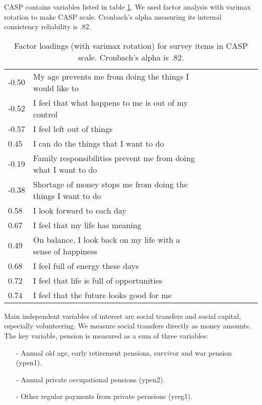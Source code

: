 \documentclass[10pt, letterpaper]{article}
\begin{document}
\begin{spacing}{1.4}
CASP contains  variables listed in table \ref{casp}. We used factor
analysis with varimax rotation to make CASP scale. Cronbach's alpha measuring its internal
consistency reliability is .82. 


\begin{table}[h!]
  \centering
  \begin{tabular}{lllllllll} %
\hline
  -0.50& My age prevents me from doing the things I would like to\\
  -0.52& I feel that what happens to me is out of my control\\
  -0.57& I feel left out of things\\
   0.45& I can do the things that I want to do\\
  -0.19& Family responsibilities prevent me from doing what I want to do\\
  -0.38& Shortage of money stops me from doing the things I want to do\\
   0.58& I look forward to each day\\
   0.67& I feel that my life has meaning\\
   0.49& On balance, I look back on my life with a sense of happiness\\
   0.68& I feel full of energy these days\\
   0.72& I feel that life is full of opportunities\\
   0.74& I feel that the future looks good for me\\\hline
  \end{tabular}
  \caption{Factor loadings (with varimax rotation) for survey items in CASP scale. Cronbach's alpha is
    .82.}
  \label{casp}
\end{table}


Main independent variables of interest are social transfers and social capital,
especially volunteering. We  measure social transfers directly as money amounts. %
 The key variable, pension is measured as a sum of three variables:
 \begin{spacing}{.9}
   \begin{itemize}
   \item[-] Annual old age, early retirement pensions, survivor and war pension
     (ypen1). %
   \item[-]  Annual private occupational pensions (ypen2). %
   \item[-] Other regular payments from private pernsions (yreg1). %
   \end{itemize}
 \end{spacing}



\end{spacing}
\end{document}
